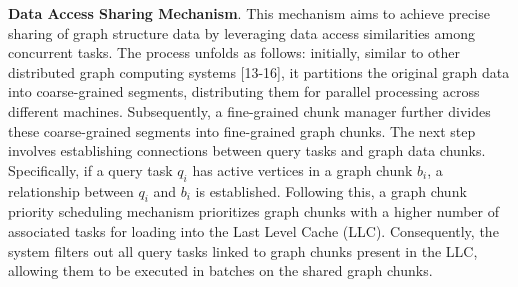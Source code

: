 \documentclass[lettersize,journal]{IEEEtran} %
\begin{document}
{\bf{Data Access Sharing Mechanism}}. This mechanism aims to achieve precise sharing of graph structure data by leveraging data access similarities among concurrent tasks. The process unfolds as follows: initially, similar to other distributed graph computing systems [13-16], it partitions the original graph data into coarse-grained segments, distributing them for parallel processing across different machines. Subsequently, a fine-grained chunk manager further divides these coarse-grained segments into fine-grained graph chunks. The next step involves establishing connections between query tasks and graph data chunks. Specifically, if a query task $q_i$ has active vertices in a graph chunk $b_i$, a relationship between $q_i$ and $b_i$ is established. Following this, a graph chunk priority scheduling mechanism prioritizes graph chunks with a higher number of associated tasks for loading into the Last Level Cache (LLC). Consequently, the system filters out all query tasks linked to graph chunks present in the LLC, allowing them to be executed in batches on the shared graph chunks.
\end{document}
